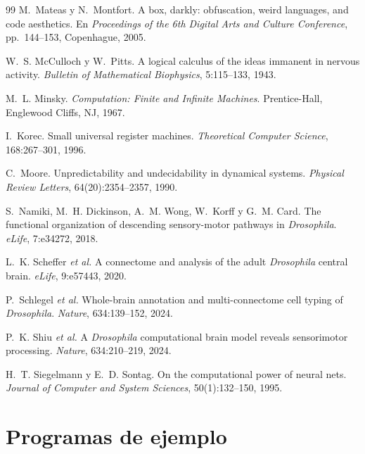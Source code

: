 \documentclass[11pt,a4paper]{article}
\theoremstyle{plain}
\theoremstyle{definition}
\theoremstyle{remark}
\begin{document}
\begin{thebibliography}{99}
M.~Mateas y N.~Montfort.
\newblock A box, darkly: obfuscation, weird languages, and code aesthetics.
\newblock En \emph{Proceedings of the 6th Digital Arts and Culture Conference},
  pp.~144--153, Copenhague, 2005.

W.~S. McCulloch y W.~Pitts.
\newblock A logical calculus of the ideas immanent in nervous activity.
\newblock \emph{Bulletin of Mathematical Biophysics}, 5:115--133, 1943.

M.~L. Minsky.
\newblock \emph{Computation: Finite and Infinite Machines}.
\newblock Prentice-Hall, Englewood Cliffs, NJ, 1967.

I.~Korec.
\newblock Small universal register machines.
\newblock \emph{Theoretical Computer Science}, 168:267--301, 1996.

C.~Moore.
\newblock Unpredictability and undecidability in dynamical systems.
\newblock \emph{Physical Review Letters}, 64(20):2354--2357, 1990.

S.~Namiki, M.~H. Dickinson, A.~M. Wong, W.~Korff y G.~M. Card.
\newblock The functional organization of descending sensory-motor pathways in
  \textit{Drosophila}.
\newblock \emph{eLife}, 7:e34272, 2018.

L.~K. Scheffer \emph{et al.}
\newblock A connectome and analysis of the adult \textit{Drosophila} central
  brain.
\newblock \emph{eLife}, 9:e57443, 2020.

P.~Schlegel \emph{et al.}
\newblock Whole-brain annotation and multi-connectome cell typing of
  \textit{Drosophila}.
\newblock \emph{Nature}, 634:139--152, 2024.

P.~K. Shiu \emph{et al.}
\newblock A \textit{Drosophila} computational brain model reveals sensorimotor
  processing.
\newblock \emph{Nature}, 634:210--219, 2024.

H.~T. Siegelmann y E.~D. Sontag.
\newblock On the computational power of neural nets.
\newblock \emph{Journal of Computer and System Sciences}, 50(1):132--150, 1995.

\end{thebibliography}

\appendix

\section{Programas de ejemplo}
\label{app:programas}
\end{document}
